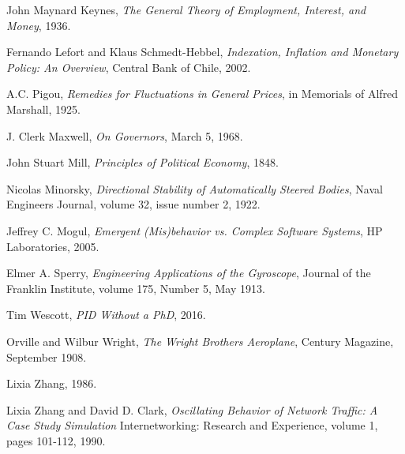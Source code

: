 \begin{thebibliography}{9}
    John Maynard Keynes,
    \emph{The General Theory of Employment, Interest, and Money},
    1936.

    Fernando Lefort and Klaus Schmedt-Hebbel,
    \emph{Indexation, Inflation and Monetary Policy: An Overview},
    Central Bank of Chile,
    2002.

    A.C. Pigou,
    \emph{Remedies for Fluctuations in General Prices},
    in Memorials of Alfred Marshall,
    1925.

    J. Clerk Maxwell,
    \emph{On Governors},
    March 5, 1968.

    John Stuart Mill,
    \emph{Principles of Political Economy},
    1848.

    Nicolas Minorsky,
    \emph{Directional Stability of Automatically Steered Bodies},
    Naval Engineers Journal,
    volume 32,
    issue number 2,
    1922.

    Jeffrey C. Mogul,
    \emph{Emergent (Mis)behavior vs. Complex Software Systems},
    HP Laboratories,
    2005.

    Elmer A. Sperry,
    \emph{Engineering Applications of the Gyroscope},
    Journal of the Franklin Institute,
    volume 175,
    Number 5,
    May 1913.

    Tim Wescott,
    \emph{PID Without a PhD},
    2016.

    Orville and Wilbur Wright,
    \emph{The Wright Brothers Aeroplane},
    Century Magazine,
    September 1908.

    Lixia Zhang,
    1986.

    Lixia Zhang and David D. Clark,
    \emph{Oscillating Behavior of Network Traffic: A Case Study Simulation}
    Internetworking: Research and Experience,
    volume 1,
    pages 101-112,
    1990.

\end{thebibliography}


